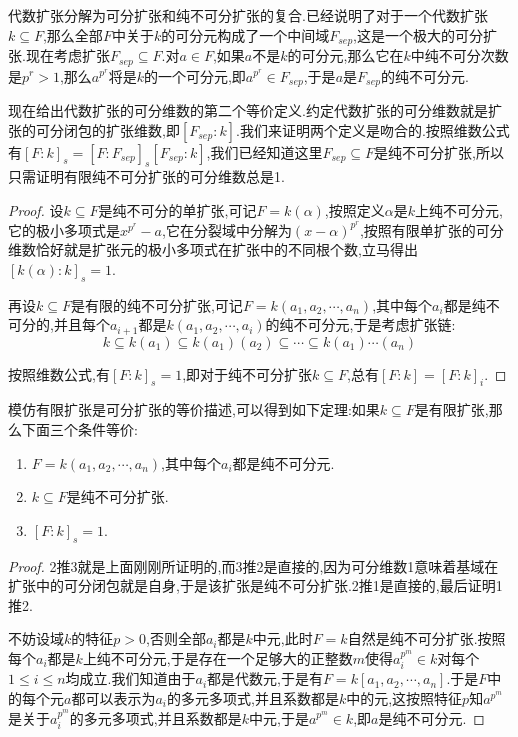 代数扩张分解为可分扩张和纯不可分扩张的复合.已经说明了对于一个代数扩张$k\subseteq F$,那么全部$F$中关于$k$的可分元构成了一个中间域$F_{sep}$,这是一个极大的可分扩张.现在考虑扩张$F_{sep}\subseteq F$.对$a\in F$,如果$a$不是$k$的可分元,那么它在$k$中纯不可分次数是$p^r>1$,那么$a^{p^r}$将是$k$的一个可分元,即$a^{p^r}\in F_{sep}$,于是$a$是$F_{sep}$的纯不可分元.

现在给出代数扩张的可分维数的第二个等价定义.约定代数扩张的可分维数就是扩张的可分闭包的扩张维数,即$[F_{sep}:k]$.我们来证明两个定义是吻合的.按照维数公式有$[F:k]_s=[F:F_{sep}]_s[F_{sep}:k]$,我们已经知道这里$F_{sep}\subseteq F$是纯不可分扩张,所以只需证明有限纯不可分扩张的可分维数总是1.
\begin{proof}

设$k\subseteq F$是纯不可分的单扩张,可记$F=k(\alpha)$,按照定义$\alpha$是$k$上纯不可分元,它的极小多项式是$x^{p^r}-a$,它在分裂域中分解为$(x-\alpha)^{p^r}$,按照有限单扩张的可分维数恰好就是扩张元的极小多项式在扩张中的不同根个数,立马得出$[k(\alpha):k]_s=1$.

再设$k\subseteq F$是有限的纯不可分扩张,可记$F=k(a_1,a_2,\cdots,a_n)$,其中每个$a_i$都是纯不可分的,并且每个$a_{i+1}$都是$k(a_1,a_2,\cdots,a_i)$的纯不可分元,于是考虑扩张链:
$$k\subseteq k(a_1)\subseteq k(a_1)(a_2)\subseteq \cdots\subseteq k(a_1)\cdots(a_n)$$

按照维数公式,有$[F:k]_s=1$,即对于纯不可分扩张$k\subseteq F$,总有$[F:k]=[F:k]_i$.
\end{proof}

模仿有限扩张是可分扩张的等价描述,可以得到如下定理:如果$k\subseteq F$是有限扩张,那么下面三个条件等价:
\begin{enumerate}
	\item $F=k(a_1,a_2,\cdots,a_n)$,其中每个$a_i$都是纯不可分元.
	\item $k\subseteq F$是纯不可分扩张.
	\item $[F:k]_s=1$.
\end{enumerate}
\begin{proof}

2推3就是上面刚刚所证明的,而3推2是直接的,因为可分维数1意味着基域在扩张中的可分闭包就是自身,于是该扩张是纯不可分扩张.2推1是直接的,最后证明1推2.

不妨设域$k$的特征$p>0$,否则全部$a_i$都是$k$中元,此时$F=k$自然是纯不可分扩张.按照每个$a_i$都是$k$上纯不可分元,于是存在一个足够大的正整数$m$使得$a_i^{p^m}\in k$对每个$1\le i\le n$均成立.我们知道由于$a_i$都是代数元,于是有$F=k[a_1,a_2,\cdots,a_n]$.于是$F$中的每个元$a$都可以表示为$a_i$的多元多项式,并且系数都是$k$中的元,这按照特征$p$知$a^{p^m}$是关于$a_i^{p^m}$的多元多项式,并且系数都是$k$中元,于是$a^{p^m}\in k$,即$a$是纯不可分元.
\end{proof}

